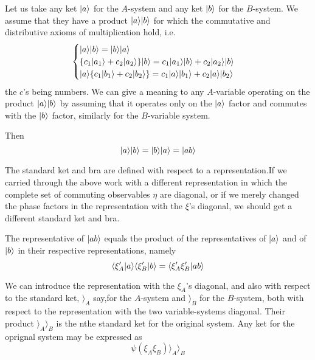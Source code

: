 	Let us take any ket $| a \rangle$ for the $A$-system and any ket $| b \rangle$ for the $B$-system. We assume that they have a product $| a \rangle| b \rangle$ for which the commutative and distributive axioms of multiplication hold, i.e.
	\begin{equation}
	\begin{cases}
	| a \rangle| b \rangle = | b \rangle| a \rangle\\
	\{c_1 | a_1 \rangle + c_2 | a_2 \rangle\} | b \rangle = c_1 | a_1 \rangle| b \rangle + c_2 | a_2 \rangle | b \rangle\\
	| a \rangle\{c_1 | b_1 \rangle + c_2 | b_2 \rangle\} = c_1 | a \rangle| b_1 \rangle + c_2 | a \rangle| b_2 \rangle
	\end{cases}
	\end{equation}
	the $c$'s being numbers. We can give a meaning to any $A$-variable operating on the product $| a \rangle| b \rangle$ by assuming that it operates only on the $| a \rangle$ factor and commutes with the $| b \rangle$ factor, similarly for the $B$-variable system.  

	Then
	\begin{equation}
	| a \rangle| b \rangle=| b \rangle| a \rangle=| ab \rangle
	\end{equation}

	The standard ket and bra are defined with respect to a representation.If we carried through the above work with a different representation in which the complete set of commuting observables $\eta$ are diagonal, or if we merely changed the phase factors in the representation with the $\xi$'s diagonal, we should get a different standard ket and bra.

	The representative of $| ab \rangle$ equals the product of the representatives of $| a \rangle$ and of $| b \rangle$ in their respective representations, namely
	\begin{equation}
	\langle \xi'_A | a \rangle\langle \xi'_B | b \rangle=\langle \xi'_A\xi'_B | ab \rangle
	\end{equation}

	We can introduce the representation with the $\xi_A$'s diagonal, and also with respect to the standard ket, $\rangle_A$ say,for the $A$-system and $\rangle_B$ for the $B$-system, both with respect to the representation with the two variable-systems diagonal. Their product $\rangle_A\rangle_B$ is the nthe standard ket for the original system. Any ket for the oprignal system may be expressed as
	\begin{equation}
	\psi(\xi_A \xi_B) \rangle_A \rangle_B
	\end{equation}

